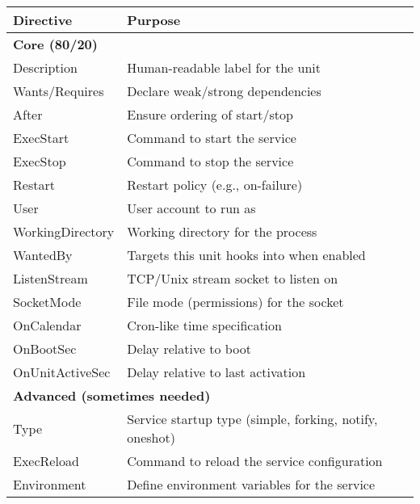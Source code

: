 \documentclass[openany, 12pt]{book}
\begin{document}
\begin{center}
  \begin{tabular}{ll}
    \toprule
    \textbf{Directive}  & \textbf{Purpose}                                        \\
    \midrule
    \multicolumn{2}{l}{\textbf{Core (80/20)}}                                     \\
    Description         & Human-readable label for the unit                       \\
    Wants/Requires      & Declare weak/strong dependencies                        \\
    After               & Ensure ordering of start/stop                           \\
    ExecStart           & Command to start the service                            \\
    ExecStop            & Command to stop the service                             \\
    Restart             & Restart policy (e.g., on-failure)                       \\
    User                & User account to run as                                  \\
    WorkingDirectory    & Working directory for the process                       \\
    WantedBy            & Targets this unit hooks into when enabled               \\
    ListenStream        & TCP/Unix stream socket to listen on                     \\
    SocketMode          & File mode (permissions) for the socket                  \\
    OnCalendar          & Cron-like time specification                            \\
    OnBootSec           & Delay relative to boot                                  \\
    OnUnitActiveSec     & Delay relative to last activation                       \\
    \midrule
    \multicolumn{2}{l}{\textbf{Advanced (sometimes needed)}}                      \\
    Type                & Service startup type (simple, forking, notify, oneshot) \\
    ExecReload          & Command to reload the service configuration             \\
    Environment         & Define environment variables for the service            \\

\end{tabular}
\end{center}
\end{document}
